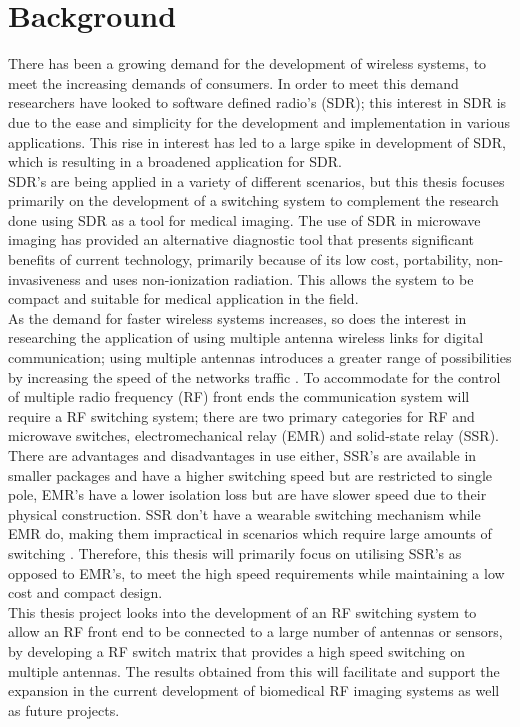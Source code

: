 \documentclass[12pt,openany,a4paper]{book}
\begin{document}
\section{Background}
\justify
There has been a growing demand for the development of wireless systems, to meet the increasing demands of consumers. In order to meet this demand researchers have looked to software defined radio's (SDR); this interest in SDR is due to the ease and simplicity for the development and implementation in various applications. This rise in interest has led to a large spike in development of SDR, which is resulting in a broadened application for SDR. \cite{ref1} \\
SDR's are being applied in a variety of different scenarios, but this thesis focuses primarily on the development of a switching system to complement the research done using SDR as a tool for medical imaging. The use of SDR in microwave imaging has provided an alternative diagnostic tool that presents significant benefits of current technology, primarily because of its low cost, portability, non-invasiveness and uses non-ionization radiation. This allows the system to be compact and suitable for medical application in the field. \cite{ref2} \cite{ref3} \\
As the demand for faster wireless systems increases, so does the interest in researching the application of using multiple antenna wireless links for digital communication; using multiple antennas introduces a greater range of possibilities by increasing the speed of the networks traffic \cite{ref4}. To accommodate for the control of multiple radio frequency (RF) front ends the communication system will require a RF switching system; there are two primary categories for RF and microwave switches, electromechanical relay (EMR) and solid-state relay (SSR). \\
There are advantages and disadvantages in use either, SSR's are available in smaller packages and have a higher switching speed but are restricted to single pole, EMR's have a lower isolation loss but are have slower speed due to their physical construction. SSR don't have a wearable switching mechanism while EMR do, making them impractical in scenarios which require large amounts of switching \cite{ref5}. Therefore, this thesis will primarily focus on utilising SSR's as opposed to EMR's, to meet the high speed requirements while maintaining a low cost and compact design. \\
This thesis project looks into the development of an RF switching system to allow an RF front end to be connected to a large number of antennas or sensors, by developing a RF switch matrix that provides a high speed switching on multiple antennas. The results obtained from this will facilitate and support the expansion in the current development of biomedical RF imaging systems as well as future projects.
\end{document}
